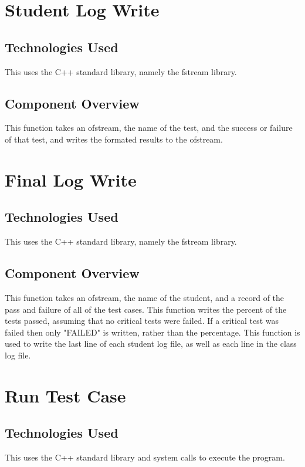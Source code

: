 \section {Student Log Write}

\subsection {Technologies Used}
This uses the C++ standard library, namely the fstream library.

\subsection {Component Overview}
This function takes an ofstream, the name of the test, and the success or failure of that test, and writes the
formated results to the ofstream.


\section {Final Log Write}

\subsection {Technologies Used}
This uses the C++ standard library, namely the fstream library.

\subsection {Component Overview}
This function takes an ofstream, the name of the student, and a record of the pass and failure of all of the test cases.  
This function writes the percent of the tests passed, assuming that no critical tests were failed.  If a critical test was failed
then only "FAILED" is written, rather than the percentage.  This function is used to write the last line of each student log file,
as well as each line in the class log file.


\section {Run Test Case}

\subsection {Technologies Used}
This uses the C++ standard library and system calls to execute the program.

